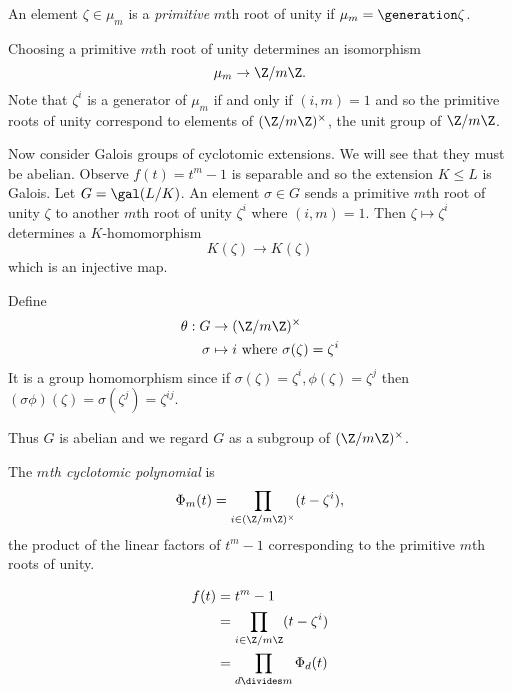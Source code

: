 \documentclass[a4paper]{article}
\begin{document}
\begin{definition}
  An element \(\zeta \in \mu_m\) is a \emph{primitive} \(m\)th root of unity if \(\mu_m = \generation \zeta\).
\end{definition}

Choosing a primitive \(m\)th root of unity determines an isomorphism
\[
  \mu_m \to \Z/m\Z.
\]
Note that \(\zeta^i\) is a generator of \(\mu_m\) if and only if \((i, m) = 1\) and so the primitive roots of unity correspond to elements of \((\Z/m\Z)^\times\), the unit group of \(\Z/m\Z\).

Now consider Galois groups of cyclotomic extensions. We will see that they must be abelian. Observe \(f(t) = t^m - 1\) is separable and so the extension \(K \leq L\) is Galois. Let \(G = \gal(L/K)\). An element \(\sigma \in G\) sends a primitive \(m\)th root of unity \(\zeta\) to another \(m\)th root of unity \(\zeta^i\) where \((i, m) = 1\). Then \(\zeta \mapsto \zeta^i\) determines a \(K\)-homomorphism
\[
  K(\zeta) \to K(\zeta)
\]
which is an injective map.

\begin{definition}
  Define
  \begin{align*}
    \theta: G &\to (\Z/m\Z)^\times \\
    \sigma &\mapsto i \text{ where } \sigma(\zeta) = \zeta^i
  \end{align*}
  It is a group homomorphism since if \(\sigma(\zeta) = \zeta^i, \phi(\zeta) = \zeta^j\) then \((\sigma\phi)(\zeta) = \sigma(\zeta^j) = \zeta^{ij}\).
\end{definition}

Thus \(G\) is abelian and we regard \(G\) as a subgroup of \((\Z/m\Z)^\times\).

\begin{definition}
  The \emph{\(m\)th cyclotomic polynomial} is
  \[
    \Phi_m(t) = \prod_{i \in (\Z/m\Z)^\times} (t - \zeta^i),
  \]
  the product of the linear factors of \(t^m - 1\) corresponding to the primitive \(m\)th roots of unity.
\end{definition}

\begin{remark}
  \begin{align*}
    f(t) &= t^m - 1 \\
         &= \prod_{i \in \Z/m\Z} (t - \zeta^i) \\
         &= \prod_{d \divides m} \Phi_d(t)
  \end{align*}
\end{remark}
\end{document}
